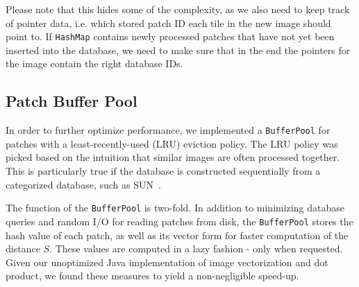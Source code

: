Please note that this hides some of the complexity, as we also need to keep
track of pointer data, i.e. which stored patch ID each tile in the new image
should point to. If \texttt{HashMap} contains newly processed patches that have
not yet been inserted into the database, we need to make sure that in the end
the pointers for the image contain the right database IDs.

\subsection{Patch Buffer Pool}

In order to further optimize performance, we implemented a \texttt{Buffer{\allowbreak}Pool}
for patches with a least-recently-used (LRU) eviction policy. The LRU policy was picked
based on the intuition that similar images are often processed together.
This is particularly true if the database is constructed sequentially from a categorized
database, such as SUN~\cite{SUN}.

The function of the \texttt{Buffer{\allowbreak}Pool} is two-fold. In addition to
minimizing database queries and random I/O for reading patches from disk, the
\texttt{Buffer{\allowbreak}Pool} stores the hash value of each patch, as well as its
vector form for faster computation of the distance $S$.
These values are computed
in a lazy fashion - only when requested. Given our unoptimized Java
implementation of image vectorization and dot product,
we found these measures to yield a non-negligible speed-up.






